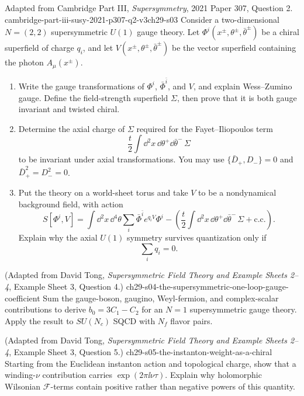 \begin{enumerate}
    {Adapted from Cambridge Part III, \emph{Supersymmetry}, 2021
    Paper 307, Question 2.}
    {cambridge-part-iii-susy-2021-p307-q2-v3ch29-s03}
  Consider a two-dimensional \(N=(2,2)\) supersymmetric \(U(1)\) gauge
  theory.  Let
  \(\Phi^i(x^\pm,\theta^\pm,\bar\theta^\pm)\) be a chiral superfield of
  charge \(q_i\), and let
  \(V(x^\pm,\theta^\pm,\bar\theta^\pm)\) be the vector superfield
  containing the photon \(A_\mu(x^\pm)\).
  \begin{enumerate}
    \item Write the gauge transformations of \(\Phi^i\),
    \(\bar\Phi^{\bar i}\), and \(V\), and explain Wess--Zumino gauge.
    Define the field-strength superfield \(\Sigma\), then prove that it is
    both gauge invariant and twisted chiral.

    \item Determine the axial charge of \(\Sigma\) required for the
    Fayet--Iliopoulos term
    \[
      \frac t2\int \dd^2x\,\dd\theta^+\dd\bar\theta^-\,\Sigma
      \tag{29.3.1}
    \]
    to be invariant under axial transformations.  You may use
    \(\{\bar D_+,D_-\}=0\) and
    \(\bar D_+^2=D_-^2=0\).

    \item Put the theory on a world-sheet torus and take \(V\) to be a
    nondynamical background field, with action
    \[
      S[\Phi^i,V]
       =\int \dd^2x\,\dd^4\theta\sum_i
          \bar\Phi^{\bar i}e^{q_iV}\Phi^i
       -\left(
          \frac t2\int \dd^2x\,\dd\theta^+\dd\bar\theta^-\,\Sigma
          +\mathrm{c.c.}\right).
      \tag{29.3.2}
    \]
    Explain why the axial \(U(1)\) symmetry survives quantization only if
    \[
      \sum_iq_i=0.
      \tag{29.3.3}
    \]
  \end{enumerate}

    {(Adapted from David Tong, \emph{Supersymmetric Field Theory and Example Sheets 2--4}, Example Sheet 3, Question 4.)}
    {ch29-s04-the-supersymmetric-one-loop-gauge-coefficient}
Sum the gauge-boson, gaugino, Weyl-fermion, and complex-scalar
  contributions to derive \(b_0=3C_1-C_2\) for an \(N=1\)
  supersymmetric gauge theory.  Apply the result to \(SU(N_c)\) SQCD
  with \(N_f\) flavor pairs.

    {(Adapted from David Tong, \emph{Supersymmetric Field Theory and Example Sheets 2--4}, Example Sheet 3, Question 5.)}
    {ch29-s05-the-instanton-weight-as-a-chiral}
Starting from the Euclidean instanton action and topological charge,
  show that a winding-\(\nu\) contribution carries
  \(\exp(2\pi \ii\nu\tau)\).  Explain why holomorphic Wilsonian
  \(\mathcal F\)-terms contain positive rather than negative powers of
  this quantity.


\end{enumerate}
